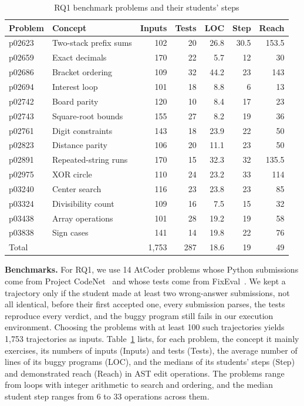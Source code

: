 \documentclass[10pt,conference]{IEEEtran}
\begin{document}
\begin{table}[h]
\caption{RQ1 benchmark problems and their students' steps}
\label{tab:data}
\centering\scriptsize
\begin{tabular}{ll||rrrrr}
\toprule
Problem & Concept & Inputs & Tests & LOC & Step & Reach \\
\midrule
p02623 & Two-stack prefix sums & 102 & 20 & 26.8 & 30.5 & 153.5 \\
p02659 & Exact decimals & 170 & 22 & 5.7 & 12 & 30 \\
p02686 & Bracket ordering & 109 & 32 & 44.2 & 23 & 143 \\
p02694 & Interest loop & 101 & 18 & 8.8 & 6 & 13 \\
p02742 & Board parity & 120 & 10 & 8.4 & 17 & 23 \\
p02743 & Square-root bounds & 155 & 27 & 8.2 & 19 & 36 \\
p02761 & Digit constraints & 143 & 18 & 23.9 & 22 & 50 \\
p02823 & Distance parity & 106 & 20 & 11.1 & 23 & 50 \\
p02891 & Repeated-string runs & 170 & 15 & 32.3 & 32 & 135.5 \\
p02975 & XOR circle & 110 & 24 & 23.2 & 33 & 114 \\
p03240 & Center search & 116 & 23 & 23.8 & 23 & 85 \\
p03324 & Divisibility count & 109 & 16 & 7.5 & 15 & 32 \\
p03438 & Array operations & 101 & 28 & 19.2 & 19 & 58 \\
p03838 & Sign cases & 141 & 14 & 19.8 & 22 & 76 \\
\midrule
Total & & 1,753 & 287 & 18.6 & 19 & 49 \\
\bottomrule
\end{tabular}
\end{table}

\noindent\textbf{Benchmarks.} For RQ1, we use 14 AtCoder problems whose Python submissions come from Project CodeNet~\cite{puri2021codenet} and whose tests come from FixEval~\cite{haque2023fixeval}. We kept a trajectory only if the student made at least two wrong-answer submissions, not all identical, before their first accepted one, every submission parses, the tests reproduce every verdict, and the buggy program still fails in our execution environment. Choosing the problems with at least 100 such trajectories yields 1,753 trajectories as inputs. Table~\ref{tab:data} lists, for each problem, the concept it mainly exercises, its numbers of inputs (Inputs) and tests (Tests), the average number of lines of its buggy programs (LOC), and the medians of its students' steps (Step) and demonstrated reach (Reach) in AST edit operations. The problems range from loops with integer arithmetic to search and ordering, and the median student step ranges from 6 to 33 operations across them.
\end{document}
